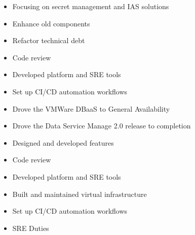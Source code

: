 \documentclass[10pt,a4paper,ragged2e,withhyper]{altacv}
\begin{document}


\makecvheader



\begin{itemize}
\item Focusing on secret management and IAS solutions
\item Enhance old components
\item Refactor technical debt
\item Code review
\item Developed platform and SRE tools
\item Set up CI/CD automation workflows
\end{itemize}
\divider

\begin{itemize}
\item Drove the VMWare DBaaS to General Availability
\item Drove the Data Service Manage 2.0 release to completion
\item Designed and developed features
\item Code review
\item Developed platform and SRE tools
\item Built and maintained virtual infrastructure
\item Set up CI/CD automation workflows
\item SRE Duties
\end{itemize}
\divider
\end{document}
